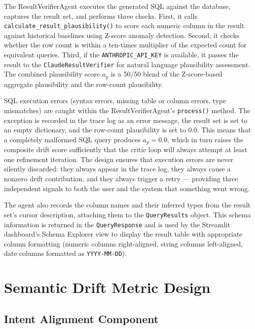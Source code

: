 \documentclass[12pt,a4paper]{report}
\begin{document}
The ResultVerifierAgent executes the generated \ac{SQL} against the database, captures the result set, and performs three checks. First, it calls \texttt{calculate\_result\_plausibility()} to score each numeric column in the result against historical baselines using Z-score anomaly detection. Second, it checks whether the row count is within a ten-times multiplier of the expected count for equivalent queries. Third, if the \texttt{ANTHROPIC\_API\_KEY} is available, it passes the result to the \texttt{ClaudeResultVerifier} for natural language plausibility assessment. The combined plausibility score $a_p$ is a 50/50 blend of the Z-score-based aggregate plausibility and the row-count plausibility.

SQL execution errors (syntax errors, missing table or column errors, type mismatches) are caught within the ResultVerifierAgent's \texttt{process()} method. The exception is recorded in the trace log as an error message, the result set is set to an empty dictionary, and the row-count plausibility is set to 0.0. This means that a completely malformed SQL query produces $a_p = 0.0$, which in turn raises the composite drift score sufficiently that the critic loop will always attempt at least one refinement iteration. The design ensures that execution errors are never silently discarded: they always appear in the trace log, they always cause a nonzero drift contribution, and they always trigger a retry — providing three independent signals to both the user and the system that something went wrong.

The agent also records the column names and their inferred types from the result set's cursor description, attaching them to the \texttt{QueryResults} object. This schema information is returned in the \texttt{QueryResponse} and is used by the Streamlit dashboard's Schema Explorer view to display the result table with appropriate column formatting (numeric columns right-aligned, string columns left-aligned, date columns formatted as \texttt{YYYY-MM-DD}).

\section{Semantic Drift Metric Design}
\label{sec:drift-metric}

\subsection{Intent Alignment Component}
\label{subsec:intent-alignment}
\end{document}
